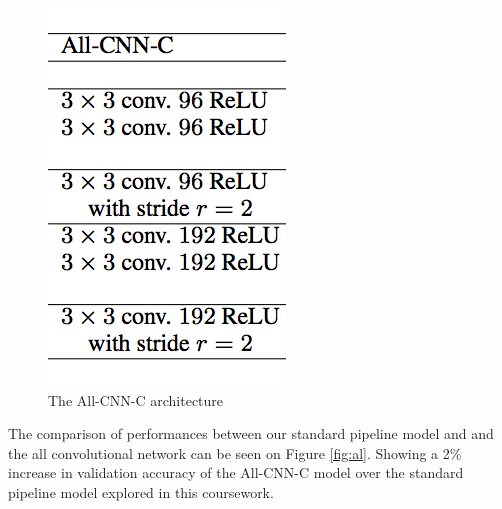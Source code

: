 \documentclass[12pt]{article}
\begin{document}
\begin{figure}[ht!]
        \centering
        \includegraphics[width=0.17\linewidth]{allcnnc.png}
    \caption{The All-CNN-C architecture}
    \label{tab:allcnn}
\end{figure}

The comparison of performances between our standard pipeline model and and the all convolutional network can be seen on Figure \ref{fig:al}. Showing a 2\% increase in validation accuracy of the All-CNN-C model over the standard pipeline model explored in this coursework.
\end{document}
